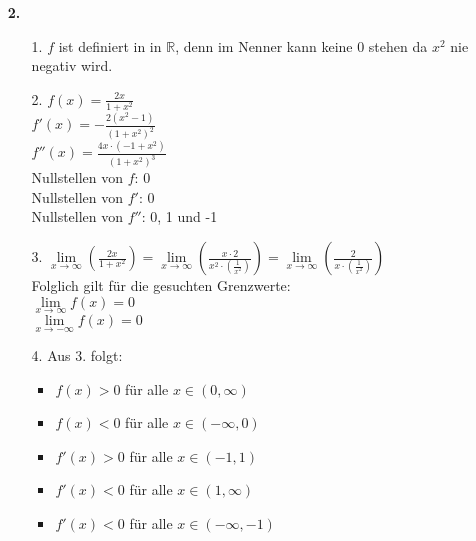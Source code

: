 \documentclass[a4paper,11pt]{scrartcl}
\newcommand{\bra}[1]{\left(#1\right)}
\newcommand{\limx}[1]{\lim\limits_{x \rightarrow \infty}\bra{#1}}
\begin{document}
\begin{enumerate}
    \item[\textbf{2.}]
        \begin{enumerate}
            \item[1.]
                $f$ ist definiert in in $\mathbb{R}$, denn im Nenner kann keine $0$ stehen da $x^2$ nie negativ wird.
            \item[2.]
                \(f(x) =  \frac{2x}{1+x^2}\) \\
                \(f'(x) =  -\frac{2(x^2-1)}{(1+x^2)^2}\) \\
                \(f''(x) =  \frac{4x \cdot (-1+x^2)}{(1+x^2)^3}\) \\
                Nullstellen von $f$: 0 \\
                Nullstellen von $f'$: 0 \\
                Nullstellen von $f''$: 0, 1 und -1
            \item[3.]
                \( \limx{\frac{2x}{1+x^2}}=\limx{\frac{x \cdot 2}{x^2 \cdot (\frac{1}{x^2})}} =\limx{\frac{2}{x \cdot (\frac{1}{x^2})}} \) \\
                Folglich gilt für die gesuchten Grenzwerte: \\
                \(\lim\limits_{x \rightarrow \infty}f(x) = 0\) \\
                \(\lim\limits_{x \rightarrow -\infty}f(x) = 0\)
            \item[4.]
                Aus 3. folgt:
                \begin{itemize}
                    \item $f(x) > 0$ für alle $x \in (0,\infty)$
                    \item $f(x) < 0$ für alle $x \in (-\infty,0)$  
                \end{itemize}
                \begin{itemize}
                    \item $f'(x) > 0$ für alle $x \in (-1,1)$
                    \item $f'(x) < 0$ für alle $x \in (1,\infty)$
                    \item $f'(x) < 0$ für alle $x \in (-\infty,-1)$  
                \end{itemize}


\end{enumerate}
\end{enumerate}
\end{document}
